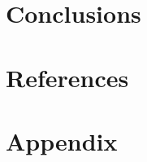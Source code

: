 \documentclass[12pt]{article}
\begin{document}
	\section{Conclusions}
	
	\section{References}
	
	\section{Appendix}


	
	
\end{document}
